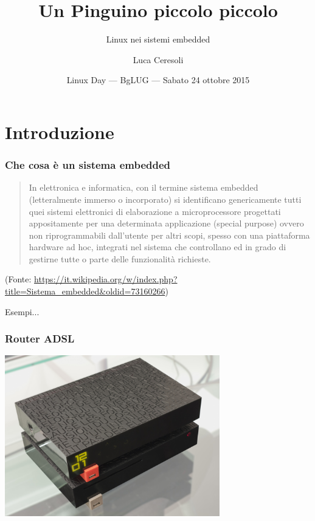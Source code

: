 \documentclass[xetex]{beamer}
\title{Un Pinguino piccolo piccolo}
\subtitle{Linux nei sistemi embedded}
\author{Luca Ceresoli}
\date{Linux Day --- BgLUG --- Sabato 24 ottobre 2015}
\begin{document}
\maketitle

\section{Introduzione}

\begin{frame}
  \frametitle{Che cosa è un sistema embedded}

  \blockquote{In elettronica e informatica, con il termine sistema
    embedded (letteralmente immerso o {\color{red} incorporato}) si
    identificano genericamente tutti quei {\color{violet} sistemi
      elettronici di elaborazione a microprocessore} progettati
    appositamente per una determinata applicazione
    ({\color{blue}special purpose}) ovvero non riprogrammabili
    dall'utente per altri scopi, spesso con una piattaforma
    {\color[rgb]{0,0.5,0} hardware ad hoc}, integrati nel sistema che
    controllano ed in grado di gestirne tutte o parte delle
    funzionalità richieste.}

  (Fonte:
  \url{https://it.wikipedia.org/w/index.php?title=Sistema_embedded&oldid=73160266})
\end{frame}

  \begin{frame}{}
    \huge
    \begin{center}
      Esempi...
    \end{center}
  \end{frame}

\begin{frame}
  \frametitle{Router ADSL}
  \begin{center}
    \includegraphics[width=0.7\textwidth]{images/freebox.jpg}
  \end{center}
\end{frame}
\end{document}
